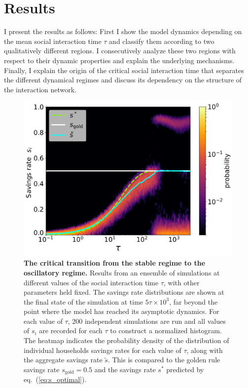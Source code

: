 \section{Results}
\label{sec:savings_results}
I present the results as follows: First I show the model dynamics depending on the mean social interaction time $\tau$ and classify them according to two qualitatively different regions. I consecutively analyze these two regions with respect to their dynamic properties and explain the underlying mechanisms. Finally, I explain the origin of the critical social interaction time that separates the different dynamical regimes and discuss its dependency on the structure of the interaction network.\\
\begin{figure}[ht]
     \centering
     \vspace{-.2 cm}
     \includegraphics[width=.9\linewidth]{figures/fig1.pdf}
     \caption[Distribution of individual savings rates depending on the social interaction rate]{\textbf{ The critical transition from the stable regime to the oscillatory regime.} 
	 Results from an ensemble of simulations at different values of the social interaction time $\tau$, with other parameters held fixed. The savings rate distributions are shown at the final state of the simulation at time $5\tau \times 10^3$, far beyond the point where the model has reached its asymptotic dynamics. For each value of $\tau$, $200$ independent simulations are run and all values of $s_i$ are recorded for each $\tau$ to construct a normalized histogram.
       The heatmap indicates the probability density of the distribution of individual households savings rates for each value of $\tau$, along with the aggregate savings rate $\tilde{s}$. This is compared to the golden rule savings rate $s_\mathrm{gold} \! = 0.5$ and the savings rate $s^*$ predicted by eq.~(\ref{eq:s_optimal}).}
	
   \label{phase}
\end{figure}
